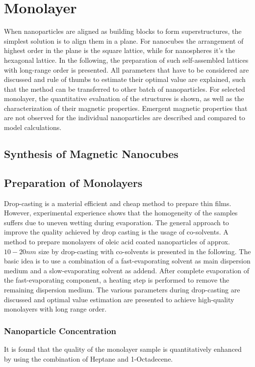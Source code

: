 \documentclass[\main/dresen_thesis.tex]{subfiles}
\renewcommand{\thisPath}{\main/chapters/monolayers}
\begin{document}
  \chapter{Monolayer}\label{ch:monolayers}
    When nanoparticles are aligned as building blocks to form superstructures, the simplest solution is to align them in a plane.
    For nanocubes the arrangement of highest order in the plane is the square lattice, while for nanospheres it's the hexagonal lattice.
    In the following, the preparation of such self-assembled lattices with long-range order is presented.
    All parameters that have to be considered are discussed and rule of thumbs to estimate their optimal value are explained, such that the method can be transferred to other batch of nanoparticles.
    For selected monolayer, the quantitative evaluation of the structures is shown, as well as the characterization of their magnetic properties. Emergent magnetic properties that are not observed for the individual nanoparticles are described and compared to model calculations.

    \section{Synthesis of Magnetic Nanocubes}
      

    \section{Preparation of Monolayers}
      Drop-casting is a material efficient and cheap method to prepare thin films.
      However, experimental experience shows that the homogeneity of the samples suffers due to uneven wetting during evaporation.
      The general approach to improve the quality achieved by drop casting is the usage of co-solvents.
      A method to prepare monolayers of oleic acid coated nanoparticles of approx. $10 - 20 \unit{nm}$ size by drop-casting with co-solvents is presented in the following.
      The basic idea is to use a combination of a fast-evaporating solvent as main dispersion medium and a slow-evaporating solvent as addend.
      After complete evaporation of the fast-evaporating component, a heating step is performed to remove the remaining dispersion medium.
      The various parameters during drop-casting are discussed and optimal value estimation are presented to achieve high-quality monolayers with long range order.

      \subsection{Nanoparticle Concentration}
        It is found that the quality of the monolayer sample is quantitatively enhanced by using the combination of Heptane and 1-Octadecene.
\end{document}
